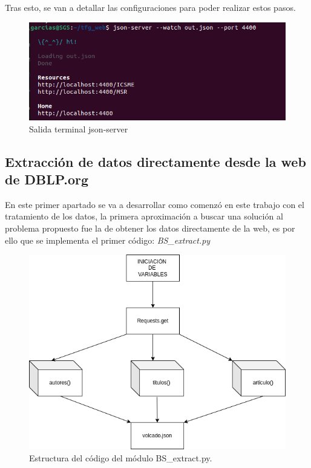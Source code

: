 \documentclass[a4paper, 12pt]{book}
\begin{document}
Tras esto, se van a detallar las configuraciones para poder realizar estos pasos.

\begin{figure}[h]
  \centering
  \includegraphics[width=15cm, keepaspectratio]{img/terminal_json_server.png}
  \caption{Salida terminal json-server}
  \label{fig:json_server}
\end{figure}

\subsection{Extracción de datos directamente desde la web de DBLP.org}

En este primer apartado se va a desarrollar como comenzó en este trabajo con el tratamiento de los datos, la primera aproximación a buscar una solución al problema propuesto fue la de obtener los datos directamente de la web, es por ello que se implementa el primer código: \textit{BS\_extract.py}

\begin{figure}[h]
  \centering
  \includegraphics[width=12cm, keepaspectratio]{img/BS_extract_graph.png}
  \caption{Estructura del código del módulo BS\_extract.py.}
  \label{fig:bs_extract}
\end{figure}
\end{document}
